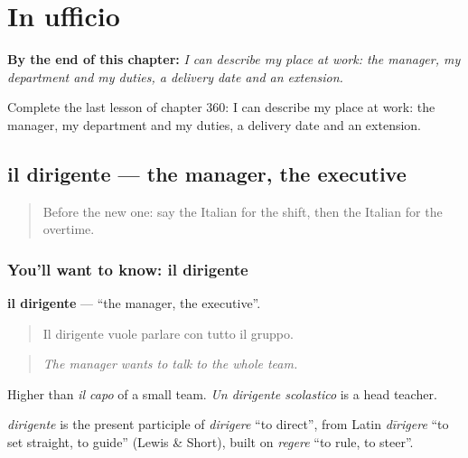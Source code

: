 
\chapter{In ufficio}
\label{ch:it-in-ufficio}

\begin{chapteropening}
\textbf{By the end of this chapter:} \emph{I can describe my place at work: the manager, my department and my duties, a delivery date and an extension.}

Complete the last lesson of chapter 360: I can describe my place at work: the manager, my department and my duties, a delivery date and an extension.
\end{chapteropening}

\section[il dirigente]{il dirigente — the manager, the executive}

\label{lesson:IT-C360-dirigente}



\begin{quote}
Before the new one: say the Italian for the shift, then the Italian for the overtime.
\end{quote}

\subsection*{You'll want to know: il dirigente}
\textbf{il dirigente} — \textquotedblleft{}the manager, the executive\textquotedblright{}.

\begin{quote}
Il dirigente vuole parlare con tutto il gruppo.
\end{quote}

\begin{quote}
\emph{The manager wants to talk to the whole team.}
\end{quote}

Higher than \emph{il capo} of a small team. \emph{Un dirigente scolastico} is a head teacher.

\begin{cousinweb}
\emph{dirigente} is the present participle of \emph{dirigere} \textquotedblleft{}to direct\textquotedblright{}, from Latin \emph{dīrigere} \textquotedblleft{}to set straight, to guide\textquotedblright{} (Lewis \& Short), built on \emph{regere} \textquotedblleft{}to rule, to steer\textquotedblright{}.
\end{cousinweb}

